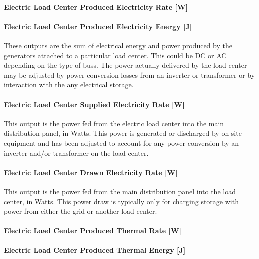 \paragraph{Electric Load Center Produced Electricity Rate {[}W{]}}\label{electric-load-center-produced-electric-power-w}

\paragraph{Electric Load Center Produced Electricity Energy {[}J{]}}\label{electric-load-center-produced-electric-energy-j}

These outputs are the sum of electrical energy and power produced by the generators attached to a particular load center. This could be DC or AC depending on the type of buss. The power actually delivered by the load center may be adjusted by power conversion losses from an inverter or transformer or by interaction with the any electrical storage.

\paragraph{Electric Load Center Supplied Electricity Rate {[}W{]}}\label{electric-load-center-supplied-electric-power-w}

This output is the power fed from the electric load center into the main distribution panel, in Watts. This power is generated or discharged by on site equipment and has been adjusted to account for any power conversion by an inverter and/or transformer on the load center.

\paragraph{Electric Load Center Drawn Electricity Rate {[}W{]}}\label{electric-load-center-drawn-electric-power-w}

This output is the power fed from the main distribution panel into the load center, in Watts. This power draw is typically only for charging storage with power from either the grid or another load center.

\paragraph{Electric Load Center Produced Thermal Rate {[}W{]}}\label{electric-load-center-produced-thermal-rate-w}

\paragraph{Electric Load Center Produced Thermal Energy {[}J{]}}\label{electric-load-center-produced-thermal-energy-j}

